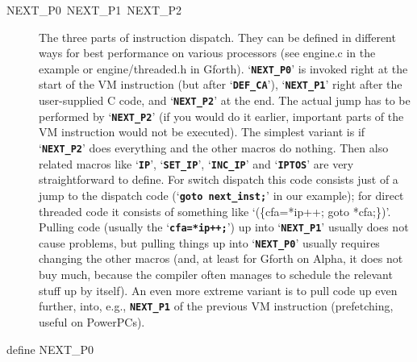 \documentclass[10pt,english]{article}
\begin{document}
\begin{description}
\item [{NEXT\_P0~NEXT\_P1~NEXT\_P2}] The three parts of instruction dispatch.
They can be defined in different ways for best performance on various
processors (see engine.c in the example or engine/threaded.h in Gforth).
\textquoteleft{}\texttt{\textbf{NEXT\_P0}}\textquoteright{} is invoked
right at the start of the VM instruction (but after \textquoteleft{}\texttt{\textbf{DEF\_CA}}\textquoteright{}),
\textquoteleft{}\texttt{\textbf{NEXT\_P1}}\textquoteright{} right
after the user-supplied C code, and \textquoteleft{}\texttt{\textbf{NEXT\_P2}}\textquoteright{}
at the end. The actual jump has to be performed by \textquoteleft{}\texttt{\textbf{NEXT\_P2}}\textquoteright{}
(if you would do it earlier, important parts of the VM instruction
would not be executed). The simplest variant is if \textquoteleft{}\texttt{\textbf{NEXT\_P2}}\textquoteright{}
does everything and the other macros do nothing. Then also related
macros like \textquoteleft{}\texttt{\textbf{IP}}\textquoteright{},
\textquoteleft{}\texttt{\textbf{SET\_IP}}\textquoteright{}, \textquoteleft{}\texttt{\textbf{INC\_IP}}\textquoteright{}
and \textquoteleft{}\texttt{\textbf{IPTOS}}\textquoteright{} are very
straightforward to define. For switch dispatch this code consists
just of a jump to the dispatch code (\textquoteleft{}\texttt{\textbf{goto
next\_inst;}}\textquoteright{} in our example); for direct threaded
code it consists of something like \textquoteleft{}(\{cfa={*}ip++;
goto {*}cfa;\})\textquoteright{}. Pulling code (usually the \textquoteleft{}\texttt{\textbf{cfa={*}ip++;}}\textquoteright{})
up into \textquoteleft{}\texttt{\textbf{NEXT\_P1}}\textquoteright{}
usually does not cause problems, but pulling things up into \textquoteleft{}\texttt{\textbf{NEXT\_P0}}\textquoteright{}
usually requires changing the other macros (and, at least for Gforth
on Alpha, it does not buy much, because the compiler often manages
to schedule the relevant stuff up by itself). An even more extreme
variant is to pull code up even further, into, e.g., \texttt{\textbf{NEXT\_P1}}
of the previous VM instruction (prefetching, useful on PowerPCs).
\end{description}
\nwenddocs{}\endmoddef
define NEXT_P0
\nwendcode{}\nwdocspar
\nwenddocs{}\endmoddef
\end{document}
